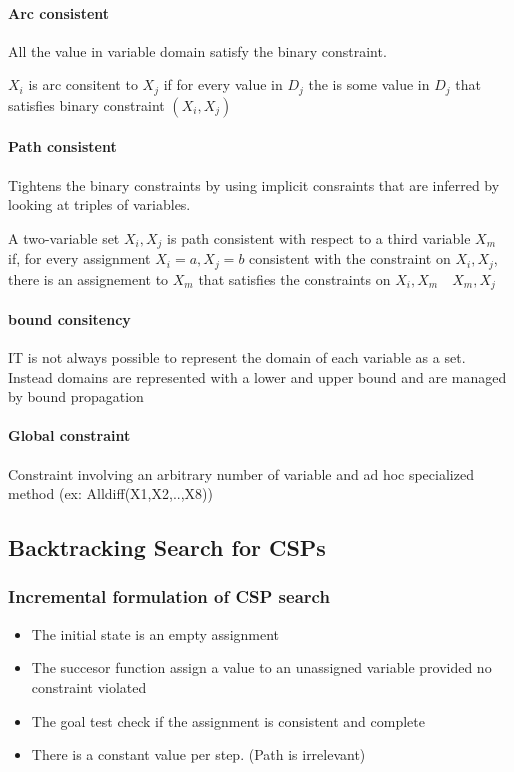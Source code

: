 \paragraph{Arc consistent} All the value  in variable domain satisfy the
binary constraint.

$X_i$ is arc consitent to $X_j$ if for every value in $D_j$ the is some value in $D_j$ that satisfies binary constraint $(X_i,X_j)$

\paragraph{Path consistent} Tightens the binary constraints by using implicit consraints that are inferred by looking at triples of variables.

A  two-variable set  ${X_i,X_j}$ is  path consistent  with respect  to a
third variable $X_m$ if, for every assignment ${X_i=a,X_j=b}$ consistent
with the  constraint on  ${X_i,X_j}$, there is  an assignement  to $X_m$
that satisfies the constraints on ${X_i,X_m}\quad{X_m,X_j}$

\paragraph{bound consitency} IT is not  always possible to represent the
domain of each variable as a set. Instead domains are represented with a
lower and upper bound and are managed by bound propagation

\paragraph{Global constraint}  Constraint involving an  arbitrary number
of variable and ad hoc specialized method (ex: Alldiff(X1,X2,..,X8))


\subsection{Backtracking Search for CSPs}

\subsubsection{Incremental formulation of CSP search }
\begin{itemize}
	\item The initial state is an empty assignment
	\item The succesor function assign a value to an unassigned variable provided no constraint violated
	\item The goal test check if the assignment is consistent and complete
	\item There is a constant value per step. (Path is irrelevant)
\end{itemize}

